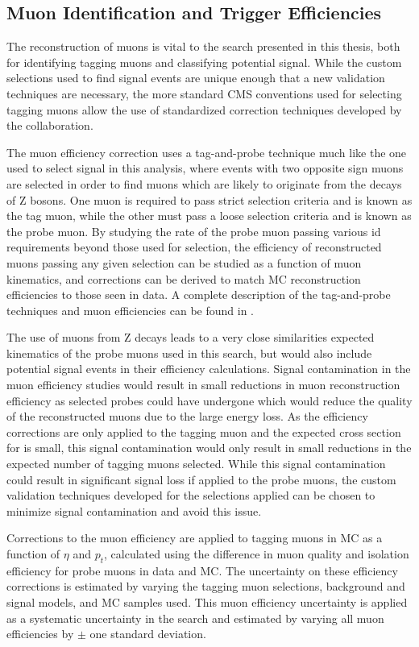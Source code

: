 \subsection{Muon Identification and Trigger Efficiencies}
The reconstruction of muons is vital to the search presented in this thesis, both for identifying tagging muons and classifying potential signal.
While the custom selections used to find signal events are unique enough that a new validation techniques are necessary, the more standard CMS conventions used for selecting tagging muons allow the use of standardized correction techniques developed by the collaboration.

The muon efficiency correction uses a tag-and-probe technique much like the one used to select signal in this analysis, where events with two opposite sign muons are selected in order to find muons which are likely to originate from the decays of Z bosons.
One muon is required to pass strict selection criteria and is known as the tag muon, while the other must pass a loose selection criteria and is known as the probe muon.
By studying the rate of the probe muon passing various id requirements beyond those used for selection, the efficiency of reconstructed muons passing any given selection can be studied as a function of muon kinematics, and corrections can be derived to match MC reconstruction efficiencies to those seen in data. 
A complete description of the tag-and-probe techniques and muon efficiencies can be found in \cite{cmsMuonPerformance}.

The use of muons from Z decays leads to a very close similarities expected kinematics of the probe muons used in this search, but would also include potential signal events in their efficiency calculations. 
Signal contamination in the muon efficiency studies would result in small reductions in muon reconstruction efficiency as selected probes could have undergone \dbrem which would reduce the quality of the reconstructed muons due to the large energy loss. 
As the efficiency corrections are only applied to the tagging muon and the expected cross section for \dbrem is small, this signal contamination would only result in small reductions in the expected number of tagging muons selected.
While this signal contamination could result in significant signal loss if applied to the probe muons, the custom validation techniques developed for the selections applied can be chosen to minimize signal contamination and avoid this issue.

Corrections to the muon efficiency are applied to tagging muons in MC as a function of $\eta$ and $p_t$, calculated using the difference in muon quality and isolation efficiency for probe muons in data and MC. 
The uncertainty on these efficiency corrections is estimated by varying the tagging muon selections, background and signal models, and MC samples used. 
This muon efficiency uncertainty is applied as a systematic uncertainty in the search and estimated by varying all muon efficiencies by $\pm$ one standard deviation.

